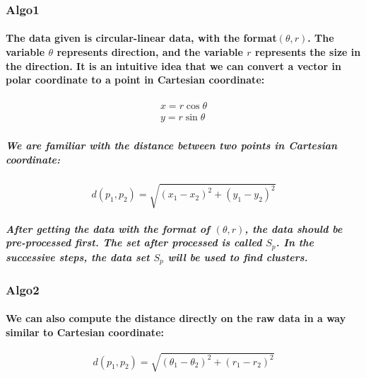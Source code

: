 \documentclass{article}
\begin{document}
\subsubsection{Algo1}
\paragraph{
The data given is circular-linear data, with the format$(\theta, r)$. The variable $\theta$ represents direction, and the variable $r$ represents the size in the direction. It is an intuitive idea that we can convert a vector in polar coordinate to a point in Cartesian coordinate:
}

\begin{equation}
\begin{aligned}
x = r \cos{\theta} \\
y = r \sin {\theta}
\end{aligned}
\end{equation}

\subparagraph{
We are familiar with the distance between two points in Cartesian coordinate:
}

\begin{equation}
d(p_{1}, p_{2}) = \sqrt{(x_{1} - x_{2})^2 + ({y_1 - y_2})^2}
\end{equation}

\subparagraph{
After getting the data with the format of $(\theta,r)$, the data should be pre-processed first. The set after processed is called $S_p$. In the successive steps, the data set $S_p$ will be used to find clusters.
}

\subsubsection{Algo2}
\paragraph{
We can also compute the distance directly on the raw data in a way similar to Cartesian coordinate:
}

\begin{equation}
d(p_1, p_2) = \sqrt{({\theta_1 - \theta_2})^2 + ({r_1 - r_2})^2}
\end{equation}
\end{document}
